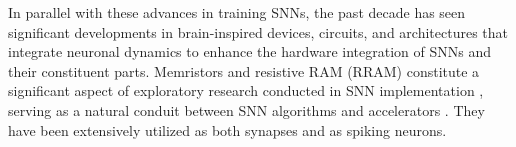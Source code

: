 
\noindent In parallel with these advances in training SNNs, the past decade has seen significant developments in brain-inspired devices, circuits, and architectures that integrate neuronal dynamics to enhance the hardware integration of SNNs and their constituent parts. Memristors and resistive RAM (RRAM) constitute a significant aspect of exploratory research conducted in SNN implementation \cite{chua1971memristor}, serving as a natural conduit between SNN algorithms and accelerators \cite{chua1976memristive}. They have been extensively utilized as both synapses and as spiking neurons.\\



